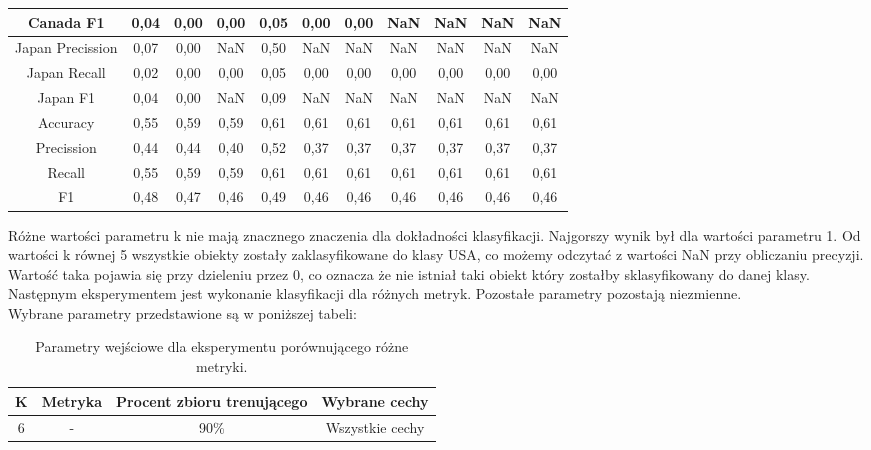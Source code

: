\documentclass{classrep}
\begin{document}
\begin{table}[h!]
\begin{tabular}{c c c c c c c c c c c}
Canada F1 			& 0,04 & 0,00 & 0,00 & 0,05 & 0,00 & 0,00 & NaN &NaN  & NaN & NaN \\
\hline
Japan Precission 		& 0,07 & 0,00 & NaN & 0,50 & NaN  & NaN & NaN & NaN & NaN & NaN \\
Japan Recall 			& 0,02 & 0,00 & 0,00 & 0,05 & 0,00 & 0,00 & 0,00 & 0,00 & 0,00 & 0,00 \\
Japan F1 				& 0,04 & 0,00 & NaN & 0,09 & NaN  & NaN & NaN & NaN & NaN & NaN\\
\hline
Accuracy 				& 0,55 & 0,59 & 0,59 & 0,61 & 0,61 & 0,61 & 0,61 & 0,61 & 0,61 & 0,61 \\
Precission 				& 0,44 & 0,44 & 0,40 & 0,52 & 0,37  & 0,37 & 0,37 &  0,37  & 0,37 & 0,37\\
Recall 				& 0,55 & 0,59 & 0,59 & 0,61 & 0,61 & 0,61 & 0,61 & 0,61 & 0,61 & 0,61  \\
F1 					& 0,48 & 0,47 & 0,46 & 0,49 & 0,46 & 0,46 & 0,46 & 0,46 & 0,46 & 0,46\\

\end {tabular}
\label {Wyniki klasyfikacji dla różnych wartości parametru k.}
\end{table}

Różne wartości parametru k nie mają znacznego znaczenia dla dokładności klasyfikacji. Najgorszy wynik był dla wartości parametru 1. Od wartości k równej 5 wszystkie obiekty zostały zaklasyfikowane do klasy USA, co możemy odczytać z wartości NaN przy obliczaniu precyzji. Wartość taka pojawia się przy dzieleniu przez 0, co oznacza że nie istniał taki obiekt który zostałby sklasyfikowany do danej klasy. \\



Następnym eksperymentem jest wykonanie klasyfikacji dla różnych metryk. Pozostałe parametry pozostają niezmienne.\\

Wybrane parametry przedstawione są w poniższej tabeli:
 
\begin{table}[h!]
\caption{Parametry wejściowe dla eksperymentu porównującego różne metryki. }
\centering
\vspace{0.1cm}
 \begin{tabular}{c c c c}
    \textbf{K} & \textbf{Metryka}   & \textbf{Procent zbioru trenującego}  & \textbf{Wybrane cechy}   \\
\hline
6 & - & 90\% &  Wszystkie cechy\\
\end {tabular}
\label {Parametry wejściowe dla eksperymentu porównującego różne metryki. }
\end{table}
\end{document}
